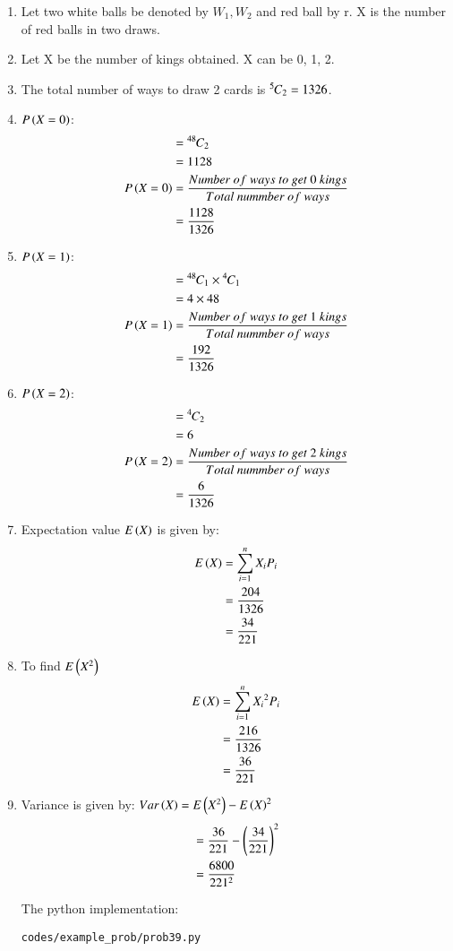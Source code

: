 \renewcommand{\theequation}{\theenumi}
\begin{enumerate}

\item Let two white balls be denoted by $W_{1}, W_{2}$ and red ball by r. X is the number of red balls in two draws.

\item Let X be the number of kings obtained. X can be 0, 1, 2.

\item The total number of ways to draw 2 cards is ${{}^{5}\mkern-1muC_{2}} = 1326$.

\item $P\left(X = 0\right)$:
\begin{align}
&= \comb{48}{2}\\
&= 1128\\
P\brak{X=0} &= \frac{Number\  of\  ways\ to\  get\ 0\ kings}{Total\ nummber\ of \ ways}\\
&= \frac{1128}{1326}
\end{align}

\item $P\left(X = 1\right)$:
\begin{align}
&= \comb{48}{1} \times \comb{4}{1}\\
&= 4 \times 48 \\
P\brak{X=1} &= \frac{Number\  of\  ways\ to\  get\ 1\ kings}{Total\ nummber\ of \ ways}\\
&= \frac{192}{1326}
\end{align}

\item $P\left(X = 2\right)$:
\begin{align}
&= \comb{4}{2} \\
&= 6 \\
P\brak{X=2} &= \frac{Number\  of\  ways\ to\  get\ 2\ kings}{Total\ nummber\ of \ ways}\\
&= \frac{6}{1326}
\end{align}

\item Expectation value $E\left(X\right)$ is given by:
\begin{align}
E\left(X\right) &= \sum^n_{i=1} X_iP_i \\
&= \frac{204}{1326}\\
&= \frac{34}{221} 
\end{align}

\item To find $E\left(X^2\right)$
\begin{align}
E\left(X\right) &= \sum^n_{i=1} {X_i}^2P_i \\
&= \frac{216}{1326}\\
&= \frac{36}{221} 
\end{align}

\item Variance is given by: $Var\left(X\right) = E\left(X^2\right) - {E\left(X\right)}^2$ 
\begin{align}
&= \frac{36}{221} - \left({\frac{34}{221}}\right)^2\\
&= \frac{6800}{221^2}
\end{align}

The python implementation:
\begin{lstlisting}
codes/example_prob/prob39.py
\end{lstlisting}


\end{enumerate}